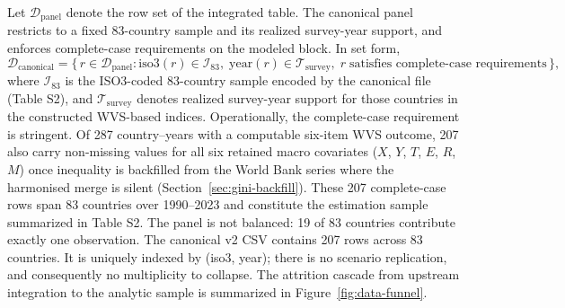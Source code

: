 \documentclass[11pt]{article}
\begin{document}
Let $\mathcal{D}_{\mathrm{panel}}$ denote the row set of the integrated table. The canonical panel restricts to a fixed 83-country sample and its realized survey-year support, and enforces complete-case requirements on the modeled block. In set form,
\begin{equation*}
\mathcal{D}_{\mathrm{canonical}} = \{\, r \in \mathcal{D}_{\mathrm{panel}} :
\text{iso3}(r) \in \mathcal{I}_{83},\; \text{year}(r) \in \mathcal{T}_{\mathrm{survey}},\; r\;\text{satisfies complete-case requirements}\,\},
\end{equation*}
where $\mathcal{I}_{83}$ is the ISO3-coded 83-country sample encoded by the canonical file (Table S2), and $\mathcal{T}_{\mathrm{survey}}$ denotes realized survey-year support for those countries in the constructed WVS-based indices.
Operationally, the complete-case requirement is stringent. Of 287 country--years with a computable six-item WVS outcome, 207 also carry non-missing values for all six retained macro covariates ($X$, $Y$, $T$, $E$, $R$, $M$) once inequality is backfilled from the World Bank series where the harmonised merge is silent (Section~\ref{sec:gini-backfill}). These 207 complete-case rows span 83 countries over 1990--2023 and constitute the estimation sample summarized in Table S2. The panel is not balanced: 19 of 83 countries contribute exactly one observation.
The canonical v2 CSV contains 207 rows across 83 countries. It is uniquely indexed by (iso3, year); there is no scenario replication, and consequently no multiplicity to collapse.
The attrition cascade from upstream integration to the analytic sample is summarized in Figure~\ref{fig:data-funnel}.
\end{document}
